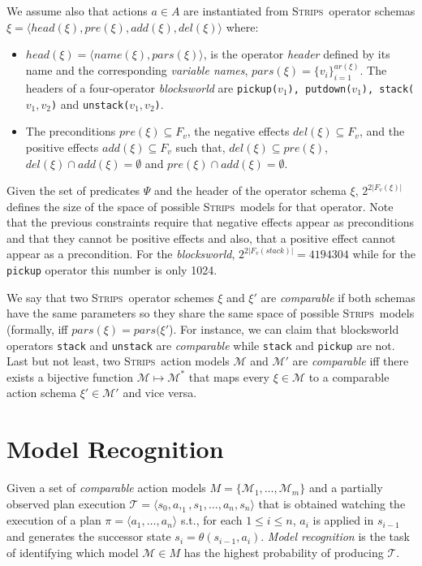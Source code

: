 \documentclass[letterpaper]{article} %
\newcommand{\tup}[1]{{\langle #1 \rangle}}
\newcommand{\strips}{\textsc{Strips}}     %
\begin{document}
We assume also that actions $a\in A$ are instantiated from \strips\ operator schemas $\xi=\tup{head(\xi),pre(\xi),add(\xi),del(\xi)}$ where:
\begin{itemize}
\item $head(\xi)=\tup{name(\xi),pars(\xi)}$, is the operator {\em header} defined by its name and the corresponding {\em variable names}, $pars(\xi)=\{v_i\}_{i=1}^{ar(\xi)}$. The headers of a four-operator {\em blocksworld} are {\small\tt pickup($v_1$), putdown($v_1$), stack($v_1,v_2$)} and {\small\tt unstack($v_1,v_2$)}.
\item The preconditions $pre(\xi)\subseteq F_v$, the negative effects $del(\xi)\subseteq F_v$, and the positive effects $add(\xi)\subseteq F_v$ such that, $del(\xi)\subseteq pre(\xi)$, $del(\xi)\cap add(\xi)=\emptyset$ and $pre(\xi)\cap add(\xi)=\emptyset$.
\end{itemize}
Given the set of predicates $\Psi$ and the header of the operator schema $\xi$, $2^{2|F_v(\xi)|}$ defines the size of the space of possible \strips\ models for that operator. Note that the previous constraints require that negative effects appear as preconditions and that they cannot be positive effects and also, that a positive effect cannot appear as a precondition. For the {\em blocksworld}, $2^{2|F_v(stack)|}=4194304$ while for the {\small\tt pickup} operator this number is only 1024.

We say that two \strips\ operator schemes $\xi$ and $\xi'$ are {\em comparable} if both schemas have the same parameters so they share the same space of possible \strips\ models (formally, iff $pars(\xi)=pars(\xi'$). For instance, we can claim that blocksworld operators {\small\tt stack} and {\small\tt unstack} are {\em comparable} while  {\small\tt stack} and {\small\tt pickup} are not. Last but not least, two \strips\ action models $\mathcal{M}$ and $\mathcal{M}'$ are {\em comparable} iff there exists a bijective function $\mathcal{M} \mapsto \mathcal{M}^*$ that maps every $\xi\in\mathcal{M}$ to a comparable action schema $\xi'\in\mathcal{M'}$ and vice versa.


\section{Model Recognition}
\label{sec:recognition}
Given a set of {\em comparable} action models $M=\{\mathcal{M}_1,\ldots,\mathcal{M}_m\}$ and a partially observed plan execution $\mathcal{T}=\tup{s_0,a,_1,s_1,\ldots,a_n,s_{n}}$ that is obtained watching the execution of a plan $\pi=\tup{a_1, \ldots, a_n}$ s.t., for each {\small $1\leq i\leq n$}, $a_i$ is applied in $s_{i-1}$ and generates the successor state $s_i=\theta(s_{i-1},a_i)$. {\em Model recognition} is the task of identifying which model $\mathcal{M}\in M$ has the highest probability of producing $\mathcal{T}$.
\end{document}

